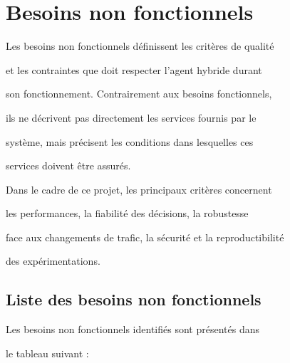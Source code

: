 \section{Besoins non fonctionnels}



Les besoins non fonctionnels définissent les critères de qualité

et les contraintes que doit respecter l'agent hybride durant

son fonctionnement. Contrairement aux besoins fonctionnels,

ils ne décrivent pas directement les services fournis par le

système, mais précisent les conditions dans lesquelles ces

services doivent être assurés.



Dans le cadre de ce projet, les principaux critères concernent

les performances, la fiabilité des décisions, la robustesse

face aux changements de trafic, la sécurité et la reproductibilité

des expérimentations.



\subsection{Liste des besoins non fonctionnels}



Les besoins non fonctionnels identifiés sont présentés dans

le tableau suivant :



